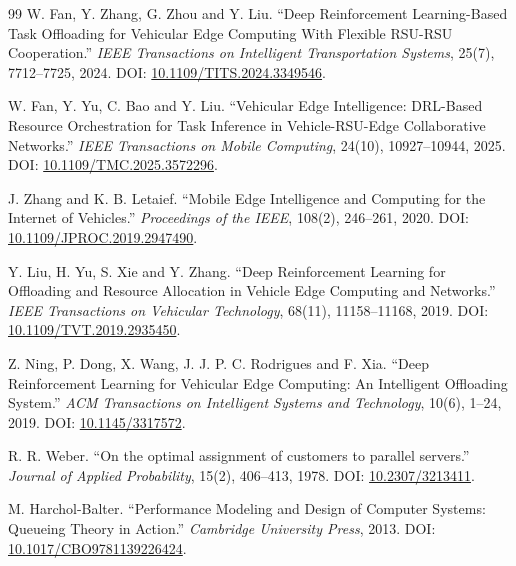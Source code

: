 \documentclass[12pt,a4paper]{article}
\begin{document}
\begin{thebibliography}{99}
 W. Fan, Y. Zhang, G. Zhou and Y. Liu. ``Deep Reinforcement Learning-Based Task Offloading for Vehicular Edge Computing With Flexible RSU-RSU Cooperation.'' \emph{IEEE Transactions on Intelligent Transportation Systems}, 25(7), 7712--7725, 2024. DOI: \href{\detokenize{https://doi.org/10.1109/TITS.2024.3349546}}{10.1109/TITS.2024.3349546}.

 W. Fan, Y. Yu, C. Bao and Y. Liu. ``Vehicular Edge Intelligence: DRL-Based Resource Orchestration for Task Inference in Vehicle-RSU-Edge Collaborative Networks.'' \emph{IEEE Transactions on Mobile Computing}, 24(10), 10927--10944, 2025. DOI: \href{\detokenize{https://doi.org/10.1109/TMC.2025.3572296}}{10.1109/TMC.2025.3572296}.

 J. Zhang and K. B. Letaief. ``Mobile Edge Intelligence and Computing for the Internet of Vehicles.'' \emph{Proceedings of the IEEE}, 108(2), 246--261, 2020. DOI: \href{\detokenize{https://doi.org/10.1109/JPROC.2019.2947490}}{10.1109/JPROC.2019.2947490}.

 Y. Liu, H. Yu, S. Xie and Y. Zhang. ``Deep Reinforcement Learning for Offloading and Resource Allocation in Vehicle Edge Computing and Networks.'' \emph{IEEE Transactions on Vehicular Technology}, 68(11), 11158--11168, 2019. DOI: \href{\detokenize{https://doi.org/10.1109/TVT.2019.2935450}}{10.1109/TVT.2019.2935450}.

 Z. Ning, P. Dong, X. Wang, J. J. P. C. Rodrigues and F. Xia. ``Deep Reinforcement Learning for Vehicular Edge Computing: An Intelligent Offloading System.'' \emph{ACM Transactions on Intelligent Systems and Technology}, 10(6), 1--24, 2019. DOI: \href{\detokenize{https://doi.org/10.1145/3317572}}{10.1145/3317572}.

 R. R. Weber. ``On the optimal assignment of customers to parallel servers.'' \emph{Journal of Applied Probability}, 15(2), 406--413, 1978. DOI: \href{\detokenize{https://doi.org/10.2307/3213411}}{10.2307/3213411}.

 M. Harchol-Balter. ``Performance Modeling and Design of Computer Systems: Queueing Theory in Action.'' \emph{Cambridge University Press}, 2013. DOI: \href{\detokenize{https://doi.org/10.1017/CBO9781139226424}}{10.1017/CBO9781139226424}.


\end{thebibliography}
\end{document}
